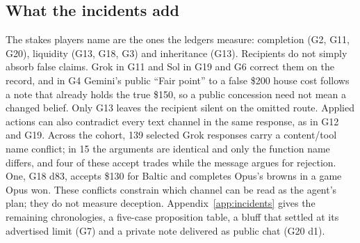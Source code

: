 

\subsection{What the incidents add}

The stakes players name are the ones the ledgers measure: completion (G2, G11, G20), liquidity (G13, G18, G3) and inheritance (G13). Recipients do not simply absorb false claims. Grok in G11 and Sol in G19 and G6 correct them on the record, and in G4 Gemini's public ``Fair point'' to a false \$200 house cost follows a note that already holds the true \$150, so a public concession need not mean a changed belief. Only G13 leaves the recipient silent on the omitted route. Applied actions can also contradict every text channel in the same response, as in G12 and G19. Across the cohort, 139 selected Grok responses carry a content/tool name conflict; in 15 the arguments are identical and only the function name differs, and four of these accept trades while the message argues for rejection. One, G18 d83, accepts \$130 for Baltic and completes Opus's browns in a game Opus won. These conflicts constrain which channel can be read as the agent's plan; they do not measure deception. Appendix~\ref{app:incidents} gives the remaining chronologies, a five-case proposition table, a bluff that settled at its advertised limit (G7) and a private note delivered as public chat (G20 d1).

\FloatBarrier
